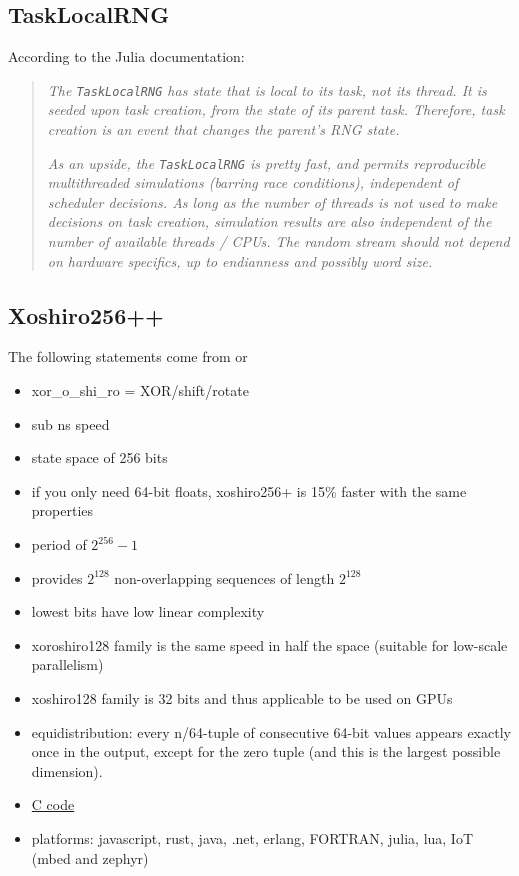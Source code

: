 \documentclass{article}
\begin{document}
        \subsection*{TaskLocalRNG}

        According to the Julia documentation\cite{Julia-2017}:

            \begin{quote}
                \textit{The \texttt{TaskLocalRNG} has state that is local to its task, not its thread. It is seeded upon task creation, from the state of its parent task. Therefore, task creation is an event that changes the parent's RNG state.}

                \textit{As an upside, the \texttt{TaskLocalRNG} is pretty fast, and permits reproducible multithreaded simulations (barring race conditions), independent of scheduler decisions. As long as the number of threads is not used to make decisions on task creation, simulation results are also independent of the number of available threads / CPUs. The random stream should not depend on hardware specifics, up to endianness and possibly word size.}
            \end{quote}

        \subsection*{Xoshiro256++}

            The following statements come from \cite{XoroshiroPaper} or \cite{Shootout}
            \begin{itemize}
                \item xor\_o\_shi\_ro = XOR/shift/rotate
                \item sub ns speed
                \item state space of 256 bits
                \item if you only need 64-bit floats, xoshiro256+ is 15\% faster with the same properties
                \item period of $2^{256} - 1$
                \item provides $2^{128}$ non-overlapping sequences of length $2^{128}$
                \item lowest bits have low linear complexity
                \item xoroshiro128 family is the same speed in half the space (suitable for low-scale parallelism)
                \item xoshiro128 family is 32 bits and thus applicable to be used on GPUs
                \item equidistribution: every n/64-tuple of consecutive 64-bit values appears exactly once in the output, except for the zero tuple (and this is the largest possible dimension).
                \item \href{https://prng.di.unimi.it/xoshiro256plusplus.c}{C code}
                \item platforms: javascript, rust, java, .net, erlang, FORTRAN, julia, lua, IoT (mbed and zephyr)
            \end{itemize}
\end{document}

